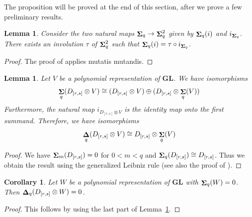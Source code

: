 \documentclass[12pt]{amsart}
\DeclareMathOperator{\Sh}{\bf{\Sigma}}
\DeclareMathOperator{\De}{\bf{\Delta}}
\newcommand{\Drs}{D_{[r,s]}}
\newcommand{\mShq}{\Sh_{q}}
\newcommand{\mDeq}{\De_{q}}
\newcommand{\GL}{\mathbf{GL}}
\numberwithin{equation}{section}
\newtheorem{lemma}[equation]{Lemma}
\newtheorem{corollary}[equation]{Corollary}
\theoremstyle{definition}
\theoremstyle{plain}
\begin{document}
The proposition will be proved at the end of this section, after we prove a few preliminary results. 

\begin{lemma}\label{lem:obvshiftlemma}
    Consider the two natural maps $\mShq \to \mShq^2$ given by $\mShq (i)$ and $i_{\mShq}$. There exists an involution $\tau$ of $\mShq^2$ such that $\mShq(i)=\tau \circ i_{\mShq}$.
\end{lemma}
\begin{proof}
The proof of \cite[Lemma~4.2]{gan22ext} applies mutatis mutandis.
\end{proof}

\begin{lemma} \label{lem:shiftofinduced}
    Let $V$ be a polynomial representation of $\GL$. We have isomorphisms
   \begin{displaymath}
   \mShq(\Drs \otimes V) \cong (\Drs \otimes V) \oplus (\Drs \otimes \Sh_q(V))
   \end{displaymath}
   Furthermore, the natural map $i_{\Drs \otimes V}$ is the identity map onto the first summand. Therefore, we have isomorphisms
  \begin{displaymath}
   \mDeq(\Drs \otimes V) \cong \Drs \otimes \Sh_q(V)
  \end{displaymath} 
\end{lemma}
\begin{proof}
We have $\Sh_m(\Drs) = 0 $ for $0 < m < q$ and $\mShq(\Drs) \cong \Drs$. Thus we obtain the result using the generalized Leibniz rule (see also the proof of \cite[Lemma~4.3]{gan22ext}).
\end{proof}
\begin{corollary}\label{cor:dfrobzero}
    Let $W$ be a polynomial representation of $\GL$ with $\mShq(W) = 0$. Then $\mDeq(\Drs\otimes W) = 0$.
\end{corollary}
\begin{proof}
This follows by using the last part of Lemma~\ref{lem:shiftofinduced}.
\end{proof}
\end{document}
